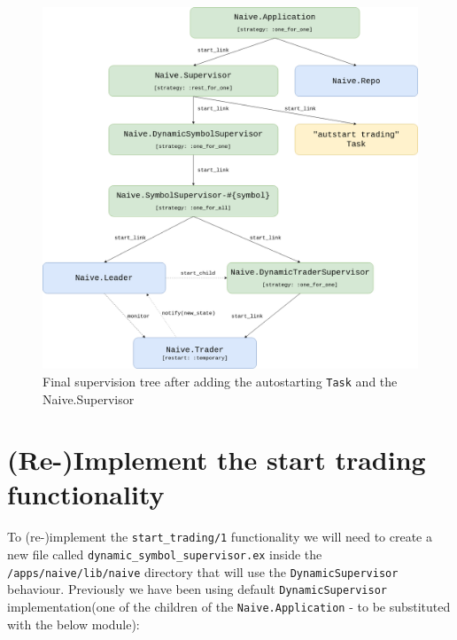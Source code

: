 \documentclass[
  oneside]{book}
\begin{document}
\begin{figure}
\centering
\includegraphics{images/chapter_12_02_sup_diagram.png}
\caption{Final supervision tree after adding the autostarting \texttt{Task} and the Naive.Supervisor}
\end{figure}

\hypertarget{re-implement-the-start-trading-functionality}{%
\section{(Re-)Implement the start trading functionality}\label{re-implement-the-start-trading-functionality}}

To (re-)implement the \texttt{start\_trading/1} functionality we will need to create a new file called \texttt{dynamic\_symbol\_supervisor.ex} inside the \texttt{/apps/naive/lib/naive} directory that will use the \texttt{DynamicSupervisor} behaviour. Previously we have been using default \texttt{DynamicSupervisor} implementation(one of the children of the \texttt{Naive.Application} - to be substituted with the below module):
\end{document}
